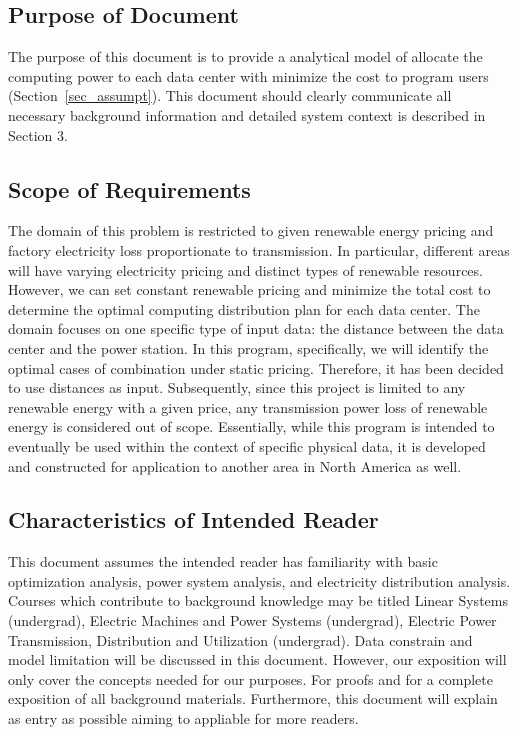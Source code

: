 \documentclass[12pt]{article}
\begin{document}
\subsection{Purpose of Document}

{The purpose of this document is to provide a analytical model of allocate the computing power to each data center with minimize the cost to program users (Section~\ref{sec_assumpt}).  This document should clearly
communicate all necessary background information and detailed system context is described in Section 3.}

\subsection{Scope of Requirements} 

 {The domain of this problem is restricted to given renewable energy pricing and factory electricity loss proportionate to transmission. In particular, different areas will have varying electricity pricing and distinct types of renewable resources. However, we can set constant renewable pricing and minimize the total cost to determine the optimal computing distribution plan for each data center. The domain focuses on one specific type of input data: the distance between the data center and the power station. In this program, specifically, we will identify the optimal cases of combination under static pricing. Therefore, it has been decided to use distances as input. Subsequently, since this project is limited to any renewable energy with a given price, any transmission power loss of renewable energy is considered out of scope. Essentially, while this program is intended to eventually be used within the context of specific physical data, it is developed and constructed for application to another area in North America as well.}  


\subsection{Characteristics of Intended Reader} \label{sec_IntendedReader}

{This document assumes the intended reader has familiarity with basic optimization analysis, power system analysis, and electricity distribution analysis. Courses which contribute to background knowledge may be titled Linear Systems (undergrad), Electric Machines and Power Systems (undergrad), Electric Power Transmission, Distribution and Utilization (undergrad). Data constrain and model limitation will be discussed in this document. However, our exposition will only cover the concepts needed for our purposes. For proofs and for a complete exposition of all background materials. Furthermore, this document will explain as entry as possible aiming to appliable for more readers.}
\end{document}

